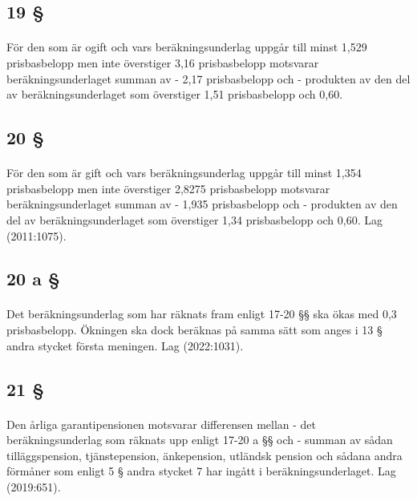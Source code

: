 \documentclass[a4paper,notitlepage,openany,10pt]{book}
\begin{document}
\subsection*{19 §}
\paragraph*{}
För den som är ogift och vars beräkningsunderlag uppgår till minst 1,529 prisbasbelopp men inte överstiger 3,16 prisbasbelopp motsvarar beräkningsunderlaget summan av
\newline - 2,17 prisbasbelopp och
\newline - produkten av den del av beräkningsunderlaget som överstiger 1,51 prisbasbelopp och 0,60.
\subsection*{20 §}
\paragraph*{}
För den som är gift och vars beräkningsunderlag uppgår till minst 1,354 prisbasbelopp men inte överstiger 2,8275 prisbasbelopp motsvarar beräkningsunderlaget summan av - 1,935 prisbasbelopp och
\newline - produkten av den del av beräkningsunderlaget som överstiger 1,34 prisbasbelopp och 0,60.
Lag (2011:1075).
\subsection*{20 a §}
\paragraph*{}
Det beräkningsunderlag som har räknats fram enligt 17-20 §§ ska ökas med 0,3 prisbasbelopp. Ökningen ska dock beräknas på samma sätt som anges i 13 § andra stycket första meningen.
Lag (2022:1031).
\subsection*{21 §}
\paragraph*{}
Den årliga garantipensionen motsvarar differensen mellan
\newline - det beräkningsunderlag som räknats upp enligt 17-20 a §§ och
\newline - summan av sådan tilläggspension, tjänstepension, änkepension, utländsk pension och sådana andra förmåner som enligt 5 § andra stycket 7 har ingått i beräkningsunderlaget.
Lag (2019:651).
\end{document}

